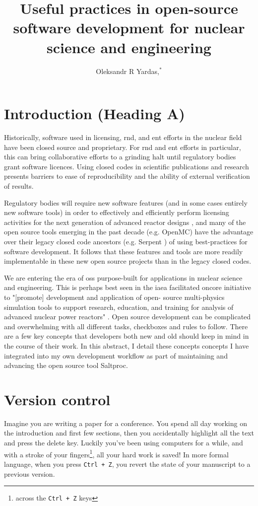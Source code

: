 \documentclass{anstrans}
\title{Useful practices in open-source software development for nuclear science and engineering}
\author{Oleksandr R Yardas,$^{*}$}
\institute{
$^{*}$Advanced Reactors and Fuel Cycles, University of Illinois - Urbana Champaign.
Champaign, IL, oyardas2@illinois.edu
}
\begin{document}
\section{Introduction (Heading A)}
    Historically, software used in licensing, \Gls{rnd}, and \Gls{ent} efforts in the nuclear field have been closed source and proprietary. For \Gls{rnd} and \Gls{ent} efforts in particular, this can bring collaborative efforts to a grinding halt until regulatory bodies grant software licences. Using closed codes in scientific publications and research presents barriers to ease of reproducibility and the ability of external verification of results.
    
    Regulatory bodies will require new software features (and in some cases entirely new software tools) in order to effectively and efficiently perform licensing activities for the next generation of advanced reactor designs \cite{usnrc_nonlwr_2020-1}, and many of the open source tools emerging in the past decade (e.g. OpenMC\cite{romano_openmc_2015}) have the advantage over their legacy closed code ancestors (e.g. Serpent \cite{leppanen_serpent_2014}) of using best-practices for software development. It follows that these features and tools are more readily implementable in these new open source projects than in the legacy closed codes.
    
    We are entering the era of \Gls{oss} purpose-built for applications in nuclear science and engineering. This is perhaps best seen in the \Gls{iaea} facilitated \Gls{oncore} initiative \cite{fiorina_initiative_2021} to "[promote] development and application of open- source multi-physics simulation tools to support research, education, and training for analysis of advanced nuclear power reactors"  \cite{iaea_open-source_2022}. Open source development can be complicated and overwhelming with all
    different tasks, checkboxes and rules to follow. There are a few key concepts that developers both new and old should keep in mind in the course of their work. In this abstract, I detail these concepts concepts I have integrated into my own development workflow as part of maintaining and advancing the open source tool Saltproc\cite{rykhlevskii_arfcsaltproc_2018}.

\section{Version control}
    Imagine you are writing a paper for a conference. You spend all day working on the introduction and first few sections, then you accidentally highlight all the text and press the delete key. Luckily you've been using computers for a while, and with a stroke of your fingers\footnote{across the \verb.Ctrl + Z. keys}, all your hard work is saved! In more formal language, when you press \verb.Ctrl + Z., you revert the state of your manuscript to a previous version.
    
\end{document}
